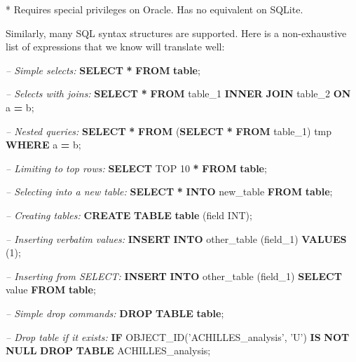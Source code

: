 \documentclass[11pt]{book}
\newenvironment{Shaded}{\begin{snugshade}}{\end{snugshade}}
\newcommand{\CommentTok}[1]{\textcolor[rgb]{0.56,0.35,0.01}{\textit{#1}}}
\newcommand{\ControlFlowTok}[1]{\textcolor[rgb]{0.13,0.29,0.53}{\textbf{#1}}}
\newcommand{\DataTypeTok}[1]{\textcolor[rgb]{0.13,0.29,0.53}{#1}}
\newcommand{\DecValTok}[1]{\textcolor[rgb]{0.00,0.00,0.81}{#1}}
\newcommand{\FunctionTok}[1]{\textcolor[rgb]{0.00,0.00,0.00}{#1}}
\newcommand{\KeywordTok}[1]{\textcolor[rgb]{0.13,0.29,0.53}{\textbf{#1}}}
\newcommand{\NormalTok}[1]{#1}
\newcommand{\OperatorTok}[1]{\textcolor[rgb]{0.81,0.36,0.00}{\textbf{#1}}}
\newcommand{\StringTok}[1]{\textcolor[rgb]{0.31,0.60,0.02}{#1}}
\theoremstyle{definition}
\theoremstyle{definition}
\theoremstyle{definition}
\theoremstyle{remark}
\begin{document}
* Requires special privileges on Oracle. Has no equivalent on SQLite.

Similarly, many SQL syntax structures are supported. Here is a non-exhaustive list of expressions that we know will translate well:

\begin{Shaded}
\begin{Highlighting}[]
\CommentTok{-- Simple selects:}
\KeywordTok{SELECT} \OperatorTok{*} \KeywordTok{FROM} \KeywordTok{table}\NormalTok{;}

\CommentTok{-- Selects with joins:}
\KeywordTok{SELECT} \OperatorTok{*} \KeywordTok{FROM}\NormalTok{ table_1 }\KeywordTok{INNER} \KeywordTok{JOIN}\NormalTok{ table_2 }\KeywordTok{ON}\NormalTok{ a }\OperatorTok{=}\NormalTok{ b;}

\CommentTok{-- Nested queries:}
\KeywordTok{SELECT} \OperatorTok{*} \KeywordTok{FROM}\NormalTok{ (}\KeywordTok{SELECT} \OperatorTok{*} \KeywordTok{FROM}\NormalTok{ table_1) tmp }\KeywordTok{WHERE}\NormalTok{ a }\OperatorTok{=}\NormalTok{ b;}

\CommentTok{-- Limiting to top rows:}
\KeywordTok{SELECT}\NormalTok{ TOP }\DecValTok{10} \OperatorTok{*} \KeywordTok{FROM} \KeywordTok{table}\NormalTok{;}

\CommentTok{-- Selecting into a new table:}
\KeywordTok{SELECT} \OperatorTok{*} \KeywordTok{INTO}\NormalTok{ new_table }\KeywordTok{FROM} \KeywordTok{table}\NormalTok{;}

\CommentTok{-- Creating tables:}
\KeywordTok{CREATE} \KeywordTok{TABLE} \KeywordTok{table}\NormalTok{ (field }\DataTypeTok{INT}\NormalTok{);}

\CommentTok{-- Inserting verbatim values:}
\KeywordTok{INSERT} \KeywordTok{INTO}\NormalTok{ other_table (field_1) }\KeywordTok{VALUES}\NormalTok{ (}\DecValTok{1}\NormalTok{);}

\CommentTok{-- Inserting from SELECT:}
\KeywordTok{INSERT} \KeywordTok{INTO}\NormalTok{ other_table (field_1) }\KeywordTok{SELECT} \FunctionTok{value} \KeywordTok{FROM} \KeywordTok{table}\NormalTok{;}
  
\CommentTok{-- Simple drop commands:}
\KeywordTok{DROP} \KeywordTok{TABLE} \KeywordTok{table}\NormalTok{;}

\CommentTok{-- Drop table if it exists:}
\ControlFlowTok{IF}\NormalTok{ OBJECT_ID(}\StringTok{'ACHILLES_analysis'}\NormalTok{, }\StringTok{'U'}\NormalTok{) }\KeywordTok{IS} \KeywordTok{NOT} \KeywordTok{NULL}
  \KeywordTok{DROP} \KeywordTok{TABLE}\NormalTok{ ACHILLES_analysis;}
  

\end{Highlighting}
\end{Shaded}
\end{document}

